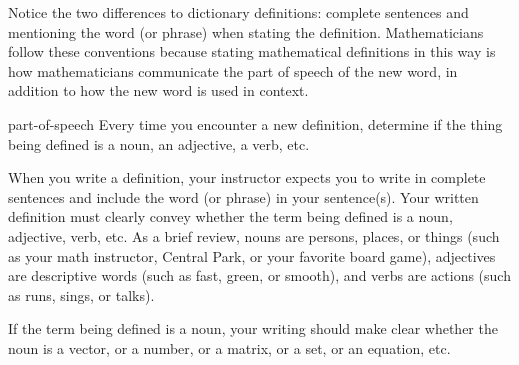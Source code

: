 \documentclass{book}
\theoremstyle{ekimcustom}
\begin{document}
Notice the two differences to dictionary definitions: complete sentences and mentioning the word (or phrase) when stating the definition.
Mathematicians follow these conventions because stating mathematical definitions in this way is how mathematicians communicate the part of speech of the new word, in addition to how the new word is used in context.
\begin{bhabit}{}{part-of-speech}
Every time you encounter a new definition, determine if the thing being defined is a noun, an adjective, a verb, etc.
\end{bhabit}
When you write a definition, your instructor expects you to write in complete sentences and include the word (or phrase) in your sentence(s). Your written definition must clearly convey whether the term being defined is a noun, adjective, verb, etc. As a brief review, nouns are persons, places, or things (such as your math instructor, Central Park, or your favorite board game), adjectives are descriptive words (such as fast, green, or smooth), and verbs are actions (such as runs, sings, or talks).

If the term being defined is a noun, your writing should make clear whether the noun is a vector, or a number, or a matrix, or a set, or an equation, etc.
\end{document}
